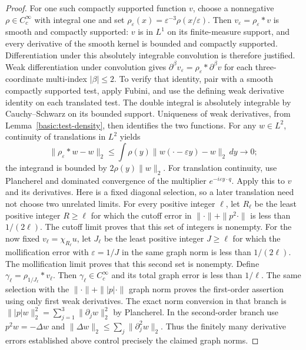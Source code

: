 \documentclass[11pt,a4paper]{article}
\theoremstyle{definition}
\theoremstyle{remark}
\begin{document}
\begin{proof}
For one such compactly supported function $v$, choose a nonnegative
$\rho\in C_c^\infty$ with integral one and set
$\rho_\varepsilon(x)=\varepsilon^{-3}\rho(x/\varepsilon)$.
Then $v_\varepsilon=\rho_\varepsilon*v$ is smooth and compactly
supported: $v$ is in $L^1$ on its finite-measure support, and every
derivative of the smooth kernel is bounded and compactly supported.
Differentiation under this absolutely integrable convolution is
therefore justified. Weak differentiation under convolution gives
$\partial^\beta v_\varepsilon=\rho_\varepsilon*\partial^\beta v$
for each three-coordinate multi-index $|\beta|\leq2$. To verify that identity, pair with a smooth
compactly supported test, apply Fubini, and use the defining weak
derivative identity on each translated test. The double integral is
absolutely integrable by Cauchy--Schwarz on its bounded support.
Uniqueness of weak derivatives, from Lemma~\ref{basic:test-density},
then identifies the two functions.
For any $w\in L^2$, continuity of translations in $L^2$ yields
\[
 \|\rho_\varepsilon*w-w\|_2
  \leq\int\rho(y)\|w(\cdot-\varepsilon y)-w\|_2\,dy\longrightarrow0;
\]
the integrand is bounded by $2\rho(y)\|w\|_2$.
For translation continuity, use Plancherel and dominated convergence
of the multiplier $e^{-i\varepsilon y\cdot q}$.
Apply this to $v$ and its derivatives. Here is a fixed diagonal
selection, so a later translation need not choose two unrelated
limits. For every positive integer $\ell$, let $R_\ell$ be the
least positive integer $R\geq\ell$ for which the cutoff error
in $\|\cdot\|+\|p^2\cdot\|$ is less than $1/(2\ell)$.
The cutoff limit proves that this set of integers is nonempty.
For the now fixed $v_\ell=\chi_{R_\ell}u$, let $J_\ell$ be
the least positive integer $J\geq\ell$ for which the
mollification error with $\varepsilon=1/J$ in the same graph
norm is less than $1/(2\ell)$. The mollification limit proves
that this second set is nonempty. Define
$\gamma_\ell=\rho_{1/J_\ell}*v_\ell$.
Then $\gamma_\ell\in C_c^\infty$ and its total graph error
is less than $1/\ell$. The same selection with the
$\|\cdot\|+\||p|\cdot\|$ graph norm proves the first-order
assertion using only first weak derivatives. The exact norm
conversion in that branch is
$\||p|w\|_2^2=\sum_{j=1}^3\|\partial_jw\|_2^2$ by
Plancherel. In the second-order branch use
$p^2w=-\Delta w$ and
$\|\Delta w\|_2\leq\sum_j\|\partial_j^2w\|_2$.
Thus the finitely many derivative errors established above
control precisely the claimed graph norms.
\end{proof}
\end{document}
